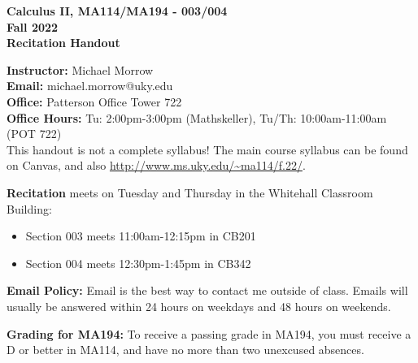 \documentclass[12pt]{article}
\newcommand{\tbf}[1]{\noindent\textbf{#1}}
\begin{document}
\begin{center}
\Large{\textbf{Calculus II, MA114/MA194 - 003/004}}\\
\Large{\textbf{Fall 2022}}\\
\Large{\textbf{Recitation Handout}}
\end{center}

\vspace{0.5cm}

\tbf{Instructor:} Michael Morrow\\
\tbf{Email:} michael.morrow@uky.edu\\
\tbf{Office:} Patterson Office Tower 722\\
\tbf{Office Hours:} Tu: 2:00pm-3:00pm (Mathskeller), Tu/Th: 10:00am-11:00am (POT 722)\\


This handout is not a complete syllabus! The main course syllabus can be found on Canvas, and also \url{http://www.ms.uky.edu/~ma114/f.22/}. 

\vspace{0.5cm}

\tbf{Recitation} meets on Tuesday and Thursday in the Whitehall Classroom Building:
\begin{itemize}[noitemsep]
\item Section 003 meets 11:00am-12:15pm in CB201
\item Section 004 meets 12:30pm-1:45pm in CB342
\end{itemize}

\vspace{0.25cm}

\tbf{Email Policy:}
Email is the best way to contact me outside of class. Emails will usually be answered within 24 hours on weekdays and 48 hours on weekends.

\vspace{0.5cm}

\tbf{Grading for MA194:}
To receive a passing grade in MA194, you must receive a D or better in MA114, and have no more than two unexcused absences.

\vspace{0.5cm}
\end{document}
